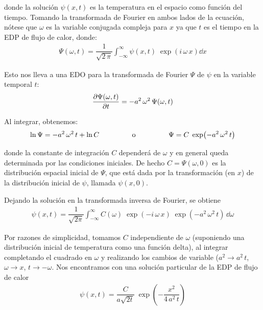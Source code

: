 donde la solución $\psi(x,t)$ es la temperatura en el espacio como función del tiempo. Tomando la transformada de Fourier en ambos lados de la ecuación, nótese que $\omega$ es la variable conjugada compleja para $x$ ya que $t$ es el tiempo en la EDP de flujo de calor, donde:
\begin{align*}
\Psi(\omega, t) = \dfrac{1}{\sqrt{2 \, \pi}} \int_{-\infty}^{\infty} \psi(x, t) \; \exp(i \, \omega \, x) \dd{x}
\end{align*}

Esto nos lleva a una EDO para la transformada de Fourier $\Psi$ de $\psi$ en la variable temporal $t$:
\begin{align*}
\pdv{\Psi(\omega, t)}{t} = -a^{2} \, \omega^{2} \, \Psi(\omega, t)
\end{align*}

Al integrar, obtenemos:
\begin{align*}
\ln \Psi = -a^{2} \, \omega^{2} \, t + \ln C \hspace{1.5cm} \text{ o } \hspace{1.5cm} \Psi = C \; \exp(-a^{2} \, \omega^{2} \, t)
\end{align*}

donde la constante de integración $C$ dependerá de $\omega$ y en general queda determinada por las condiciones iniciales. De hecho $C = \Psi(\omega, 0)$ es la distribución espacial inicial de $\Psi$, que está dada por la transformación (en $x$) de la distribución inicial de $\psi$, llamada $\psi(x,0)$.
\par
Dejando la solución en la transformada inversa de Fourier, se obtiene
\begin{align*}
\psi(x, t) = \dfrac{1}{\sqrt{2 \pi}} \int_{-\infty}^{\infty} C(\omega) \; \exp(-i \, \omega \, x) \; \exp(-a^{2} \, \omega^{2} \, t) \, \dd{\omega}
\end{align*}

Por razones de simplicidad, tomamos $C$ independiente de $\omega$ (suponiendo una distribución inicial de temperatura como una función delta), al integrar completando el cuadrado en $\omega$ y realizando los cambios de variable ($a^{2} \to a^{2} \, t$, $\omega \to x$, $t \to -\omega$. Nos encontramos con una solución particular de la EDP de flujo de calor
\begin{align*}
\psi(x,t) = \dfrac{C}{a \sqrt{2 t}} \; \exp \left( - \dfrac{x^{2}}{4 \, a^{2} \, t} \right)
\end{align*}

